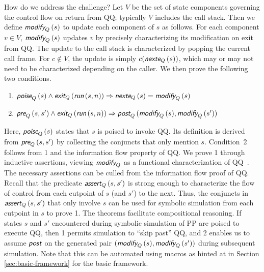 \documentclass[conference]{IEEEtran}
\newcommand{\proc}[1]{\ifmmode\mbox{\textsc{#1}}\else\textsc{#1}\fi}
\newcommand{\func}[1]{\ensuremath{\mbox{{\sf {\em #1}}}}}
\begin{document}
How do we address the challenge?  Let $V$ be the set of state
components governing the control flow on return from \proc{Q};
typically $V$ includes the call stack.  Then we define
$\func{modify}_Q\,(s)$ to update each component of $s$ as follows.
For each component $v\in V$, $\func{modify}_Q\,(s)$ updates $v$ by
precisely characterizing its modification on exit from \proc{Q}. The
update to the call stack is characterized by popping the current call
frame.  For $c\not\in V$, the update is simply
$c(\func{nexte}_Q\,(s))$, which may or may not need to be
characterized depending on the caller.  We then prove the following
two conditions.

\begin{enumerate}
\item 
$\func{poise}_Q\,(s) \wedge \func{exit}_Q\,(\func{run}\,(s,n))
\Rightarrow\func{nexte}_Q\,(s)=\func{modify}_Q\,(s)$
\item
$\func{pre}_Q\,(s,s') \wedge \func{exit}_Q\,(\func{run}\,(s,n))
  \Rightarrow \\
\func{post}_Q\,(\func{modify}_Q\,(s),\func{modify}_Q\,(s'))$ 
\end{enumerate}

\noindent
Here, $\func{poise}_Q\,(s)$ states that $s$ is poised to invoke
\proc{Q}. Its definition is derived from $\func{pre}_Q\,(s,s')$ by
collecting the conjuncts that only mention $s$.  Condition~2 follows
from 1 and the information flow property of \proc{Q}.  We prove 1
through inductive assertions, viewing $\func{modify}_Q$ as a functional
characterization of \proc{Q}~\cite{symbolic}.  The necessary
assertions can be culled from the information flow proof of \proc{Q}.
Recall that the predicate $\func{assert}_Q\,(s,s')$ is strong enough to
characterize the flow of control from each cutpoint of $s$ (and $s'$)
to the next. Thus, the conjuncts in $\func{assert}_Q\,(s,s')$ that only
involve $s$ can be used for symbolic simulation from each cutpoint in
$s$ to prove 1.  The theorems facilitate compositional reasoning.  If
states $s$ and $s'$ encountered during symbolic simulation of \proc{P}
are poised to execute \proc{Q}, then 1 permits simulation to ``skip
past'' \proc{Q}, and 2 enables us to assume \func{post} on the
generated pair $(\func{modify}_Q\,(s), \func{modify}_Q\,(s'))$ during subsequent
simulation.  Note that this can be automated using macros as hinted at
in Section \ref{sec:basic-framework} for the basic framework.
\end{document}
